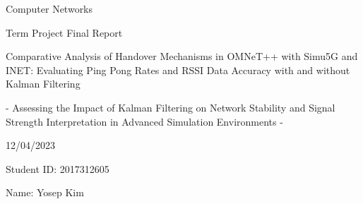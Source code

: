 \thispagestyle{empty}


\noindent Computer Networks 

\vspace{0.5cm}

\noindent Term Project Final Report 
\vspace*{1.5cm} 


\begin{center}
	\Huge
Comparative Analysis of Handover Mechanisms in OMNeT++ with Simu5G and INET: Evaluating Ping Pong Rates and RSSI Data Accuracy with and without Kalman Filtering	\vspace{1cm} 

	\Large
- Assessing the Impact of Kalman Filtering on Network Stability and Signal Strength Interpretation in Advanced Simulation Environments - 
\vspace*{4.5cm} 


	\vspace{1.5cm} 

        12/04/2023
	

	\vspace{1cm} 

	Student ID: 2017312605 \\

	\vspace{0.5cm} 

	

	\vspace{0.5cm} 

	Name: Yosep Kim
\end{center}

\vfill

\newpage

